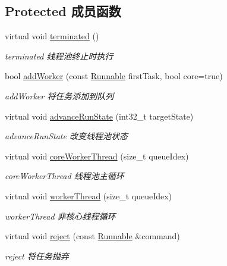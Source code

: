 \subsection*{Protected 成员函数}
\begin{DoxyCompactItemize}
\item 
\mbox{\label{classThreadPoolExecutor_a61774315237123faf8e7fcc9d35ae47d}} 
virtual void \hyperlink{classThreadPoolExecutor_a61774315237123faf8e7fcc9d35ae47d}{terminated} ()
\begin{DoxyCompactList}\small\item\em terminated 线程池终止时执行 \end{DoxyCompactList}\item 
bool \hyperlink{classThreadPoolExecutor_af961c5c8f699e77673627a19aad363f6}{add\+Worker} (const \hyperlink{classRunnable}{Runnable} first\+Task, bool core=true)
\begin{DoxyCompactList}\small\item\em add\+Worker 将任务添加到队列 \end{DoxyCompactList}\item 
virtual void \hyperlink{classThreadPoolExecutor_a554449ac43b629a1daced2000d730ecf}{advance\+Run\+State} (int32\+\_\+t target\+State)
\begin{DoxyCompactList}\small\item\em advance\+Run\+State 改变线程池状态 \end{DoxyCompactList}\item 
virtual void \hyperlink{classThreadPoolExecutor_a5e40839bf4191b5eab9d81227ddb62c3}{core\+Worker\+Thread} (size\+\_\+t queue\+Idex)
\begin{DoxyCompactList}\small\item\em core\+Worker\+Thread 线程池主循环 \end{DoxyCompactList}\item 
virtual void \hyperlink{classThreadPoolExecutor_a844902ce61fb16b11a569b8ee56e80e9}{worker\+Thread} (size\+\_\+t queue\+Idex)
\begin{DoxyCompactList}\small\item\em worker\+Thread 非核心线程循环 \end{DoxyCompactList}\item 
virtual void \hyperlink{classThreadPoolExecutor_a23a7c5908db3ef6f0e2afba6f0ca0450}{reject} (const \hyperlink{classRunnable}{Runnable} \&command)
\begin{DoxyCompactList}\small\item\em reject 将任务抛弃 \end{DoxyCompactList}\item 

\end{DoxyCompactItemize}
